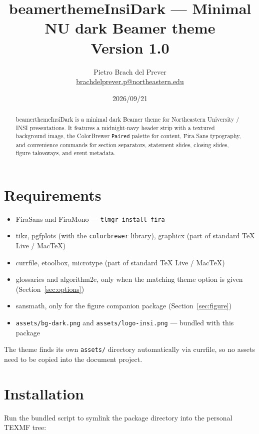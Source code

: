 \documentclass[a4paper,11pt]{article}
\title{\textsf{beamerthemeInsiDark} --- Minimal NU dark Beamer theme\\[4pt]
  \large Version 1.0}
\author{Pietro Brach del Prever\\
  \small\href{mailto:brachdelprever.p@northeastern.edu}{brachdelprever.p@northeastern.edu}}
\date{2026/09/21}
\begin{document}
\maketitle

\begin{abstract}
	\textsf{beamerthemeInsiDark} is a minimal dark Beamer theme for
	Northeastern University / INSI presentations.  It features a midnight-navy
	header strip with a textured background image, the ColorBrewer
	\texttt{Paired} palette for content, Fira Sans typography, and convenience
	commands for section separators, statement slides, closing slides, figure
	takeaways, and event metadata.
\end{abstract}

\tableofcontents

\section{Requirements}

\begin{itemize}
	\item \textsf{FiraSans} and \textsf{FiraMono} ---
	      \texttt{tlmgr install fira}
	\item \textsf{tikz}, \textsf{pgfplots} (with the \texttt{colorbrewer}
	      library), \textsf{graphicx} (part of standard TeX Live / MacTeX)
	\item \textsf{currfile}, \textsf{etoolbox}, \textsf{microtype} (part of
	      standard TeX Live / MacTeX)
	\item \textsf{glossaries} and \textsf{algorithm2e}, only when the matching
	      theme option is given (Section~\ref{sec:options})
	\item \textsf{sansmath}, only for the figure companion package
	      (Section~\ref{sec:figure})
	\item \texttt{assets/bg-dark.png} and \texttt{assets/logo-insi.png} ---
	      bundled with this package
\end{itemize}

The theme finds its own \texttt{assets/} directory automatically via
\textsf{currfile}, so no assets need to be copied into the document project.

\section{Installation}

Run the bundled script to symlink the package directory into the personal
TEXMF tree:
\end{document}
